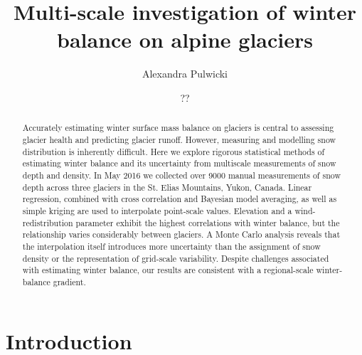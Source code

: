 \documentclass{sfuthesis}
\title{Multi-scale investigation of winter balance on alpine glaciers}
\author{Alexandra Pulwicki}
\date{??}
\begin{document}
\frontmatter
\maketitle{}
\makecommittee{}

\begin{abstract}
	Accurately estimating winter surface mass balance on glaciers is central to assessing glacier health and predicting glacier runoff. However, measuring and modelling snow distribution is inherently difficult. Here we explore rigorous statistical methods of estimating winter balance and its uncertainty from multiscale measurements of snow depth and density. In May 2016 we collected over 9000 manual measurements of snow depth across three glaciers in the St. Elias Mountains, Yukon, Canada. Linear regression, combined with cross correlation and Bayesian model averaging, as well as simple kriging are used to interpolate point-scale values. Elevation and a wind-redistribution parameter exhibit the highest correlations with winter balance, but the relationship varies considerably between glaciers. A Monte Carlo analysis reveals that the interpolation itself introduces more uncertainty than the assignment of snow density or the representation of grid-scale variability. Despite challenges associated with estimating winter balance, our results are consistent with a regional-scale winter-balance gradient.
\end{abstract}


\begin{dedication} %
\end{dedication}


\begin{acknowledgements} %
\end{acknowledgements}

\tableofcontents\clearpage
{}\listoftables\clearpage
{}\listoffigures






\mainmatter%

\chapter{Introduction}
\end{document}
